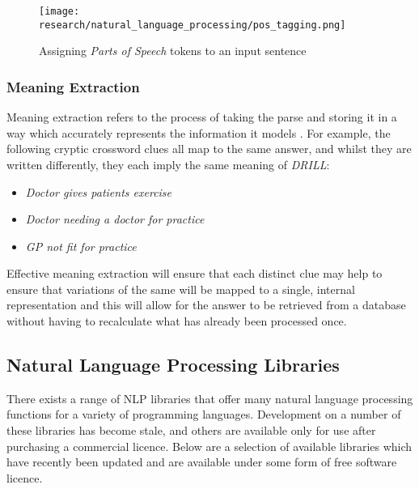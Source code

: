 \begin{figure}[!ht]
	\texttt{[image: research/natural\_language\_processing/pos\_tagging.png]}
	\caption{Assigning \emph{Parts of Speech} tokens to an input sentence}
\end{figure}

\subsubsection{Meaning Extraction}

Meaning extraction refers to the process of taking the parse and storing it in a way which accurately represents the information it models \citep{mccluskey99}. For example, the following cryptic crossword clues all map to the same answer, and whilst they are written differently, they each imply the same meaning of \emph{DRILL}:

\begin{itemize}
	\item\emph{Doctor gives patients exercise}
	\item\emph{Doctor needing a doctor for practice}
	\item\emph{GP not fit for practice}
\end{itemize}

\begin{flushright}
	\citep{gordius03}
\end{flushright}

Effective meaning extraction will ensure that each distinct clue may help to ensure that variations of the same will be mapped to a single, internal representation and this will allow for the answer to be retrieved from a database without having to recalculate what has already been processed once.

\subsection{Natural Language Processing Libraries}

There exists a range of NLP libraries that offer many natural language processing functions for a variety of programming languages. Development on a number of these libraries has become stale, and others are available only for use after purchasing a commercial licence. Below are a selection of available libraries which have recently been updated and are available under some form of free software licence.

